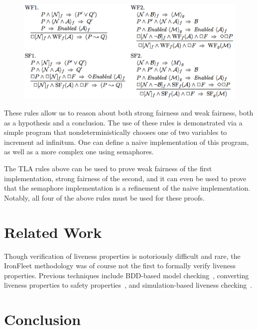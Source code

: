 \documentclass{llncs}
\begin{document}
\begin{figure}
\includegraphics[scale=0.6]{tla-rules}
\centering
\end{figure}

These rules allow us to reason about both strong fairness and weak fairness,
both as a hypothesis and a conclusion. The use of these rules is demonstrated
via a simple program that nondeterministically chooses one of two variables to
increment ad infinitum. One can define a naive implementation of this program,
as well as a more complex one using semaphores.

The TLA rules above can be used to prove weak fairness of the first
implementation, strong fairness of the second, and it can even be used to prove
that the semaphore implementation is a refinement of the naive implementation.
Notably, all four of the above rules must be used for these proofs.


\section{Related Work}\label{sec:rel-work}
Though verification of liveness properties is notoriously difficult and rare,
the IronFleet methodology was of course not the first to formally verify
liveness properties. Previous techniques include BDD-based model
checking~\cite{Ravi2000}, converting liveness properties to safety
properties~\cite{Schuppan2006}, and simulation-based liveness
checking~\cite{simulation-liveness}.
%
\section{Conclusion}

%
%



\end{document}

